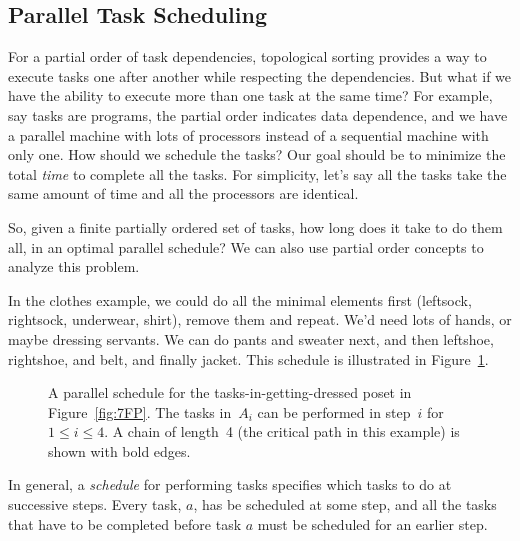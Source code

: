 \subsection{Parallel Task Scheduling}\label{parallel_sec}

For a partial order of task dependencies, topological sorting provides a
way to execute tasks one after another while respecting the dependencies.
But what if we have the ability to execute more than one task at the same
time?  For example, say tasks are programs, the partial order indicates
data dependence, and we have a parallel machine with lots of processors
instead of a sequential machine with only one.  How should we schedule the
tasks?  Our goal should be to minimize the total \emph{time} to complete
all the tasks.  For simplicity, let's say all the tasks take the same
amount of time and all the processors are identical.

So, given a finite partially ordered set of tasks, how long does it take
to do them all, in an optimal parallel schedule?  We can also use partial
order concepts to analyze this problem.

In the clothes example, we could do all the minimal elements first
(leftsock, rightsock, underwear, shirt), remove them and repeat.  We'd
need lots of hands, or maybe dressing servants.  We can do pants and
sweater next, and then leftshoe, rightshoe, and belt, and finally jacket.
This schedule is illustrated in Figure~\ref{fig:7FS}.

\begin{figure}



\caption{A parallel schedule for the tasks-in-getting-dressed poset in
Figure~\ref{fig:7FP}.  The tasks in~$A_i$ can be performed in step~$i$
for $1 \le i \le 4$.  A chain of length~4 (the critical path in this
example) is shown with bold edges.}

\label{fig:7FS}

\end{figure}

In general, a \emph{schedule} for performing tasks specifies which
tasks to do at successive steps.  Every task, $a$, has be scheduled at
some step, and all the tasks that have to be completed before task $a$
must be scheduled for an earlier step.

